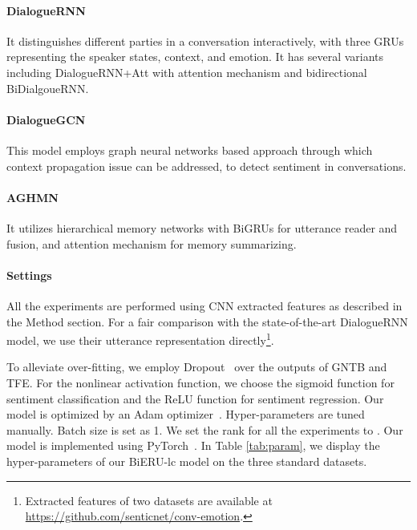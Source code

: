 \documentclass[journal]{IEEEtran}
\begin{document}
\paragraph{DialogueRNN~\cite{majumder2019dialoguernn}}
It distinguishes different parties in a conversation interactively, with three GRUs representing the speaker states, context, and emotion.
It has several variants including DialogueRNN+Att with attention mechanism and bidirectional BiDialgoueRNN.


\paragraph{DialogueGCN~\cite{ghosal2019dialoguegcn}}
This model employs graph neural networks based approach through which context propagation issue can be addressed, to detect sentiment in conversations.
\paragraph{AGHMN~\cite{jiao2019real}}
It utilizes hierarchical memory networks with BiGRUs for utterance reader and fusion, and attention mechanism for memory summarizing.

\paragraph{Settings}
All the experiments are performed using CNN extracted features as described in the Method section. For a fair comparison with the state-of-the-art DialogueRNN model, we use their utterance representation directly\footnote{Extracted features of two datasets are available at \url{https://github.com/senticnet/conv-emotion}.}.

To alleviate over-fitting, we employ
Dropout~\cite{srivastava2014dropout} over the outputs of GNTB and TFE. For the nonlinear activation function, we choose the sigmoid function for sentiment classification and the ReLU function for sentiment regression. Our model is optimized by an Adam optimizer~\cite{kingma2014adam}. Hyper-parameters are tuned manually. Batch size is set as 1. We set the rank for all the experiments to . Our model is implemented using PyTorch~\cite{paszke2019pytorch}. In Table \ref{tab:param}, we display the hyper-parameters of our BiERU-lc model on the three standard datasets.
\end{document}
